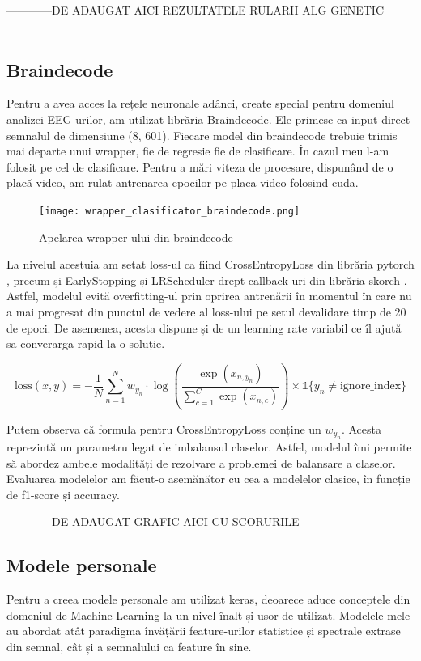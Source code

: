 ------------DE ADAUGAT AICI REZULTATELE RULARII ALG GENETIC------------

\subsection{Braindecode}
Pentru a avea acces la rețele neuronale adânci, create special pentru domeniul analizei EEG-urilor, am utilizat librăria Braindecode. Ele primesc ca input direct semnalul de dimensiune (8, 601). Fiecare model din braindecode trebuie trimis mai departe unui wrapper, fie de regresie fie de clasificare. În cazul meu l-am folosit pe cel de clasificare. Pentru a mări viteza de procesare, dispunând de o placă video, am rulat antrenarea epocilor pe placa video folosind cuda.

\vspace{1em}
\begin{figure}[h]
    \centering
    \texttt{[image: wrapper\_clasificator\_braindecode.png]}
    \caption{Apelarea wrapper-ului din braindecode}
    \label{fig:enter-label}
\end{figure}

La nivelul acestuia am setat loss-ul ca fiind CrossEntropyLoss din librăria pytorch \cite{pytorch}, precum și EarlyStopping și LRScheduler drept callback-uri din librăria skorch \cite{skorch}. Astfel, modelul evită overfitting-ul prin oprirea antrenării în momentul în care nu a mai progresat din punctul de vedere al loss-ului pe setul devalidare timp de 20 de epoci. De asemenea, acesta dispune și de un learning rate variabil ce îl ajută sa converarga rapid la o soluție. 

\begin{equation}
    \text{loss}(x, y) = -\frac{1}{N} \sum_{n=1}^{N} w_{y_n} \cdot \log\left(\frac{\exp(x_{n,y_n})}{\sum_{c=1}^{C} \exp(x_{n,c})}\right) \times \mathbb{1}\{y_n \neq \text{ignore\_index}\}
\end{equation}

Putem observa că formula pentru CrossEntropyLoss conține un \(w_{y_n}\). Acesta reprezintă un parametru legat de imbalansul claselor. Astfel, modelul îmi permite să abordez ambele modalități de rezolvare a problemei de balansare a claselor. Evaluarea modelelor am făcut-o asemănător cu cea a modelelor clasice, în funcție de f1-score și accuracy.

------------DE ADAUGAT GRAFIC AICI CU SCORURILE------------


\subsection{Modele personale}
Pentru a creea modele personale am utilizat keras, deoarece aduce conceptele din domeniul de Machine Learning la un nivel înalt și ușor de utilizat. Modelele mele au abordat atât paradigma învățării feature-urilor statistice și spectrale extrase din semnal, cât și a semnalului ca feature în sine.